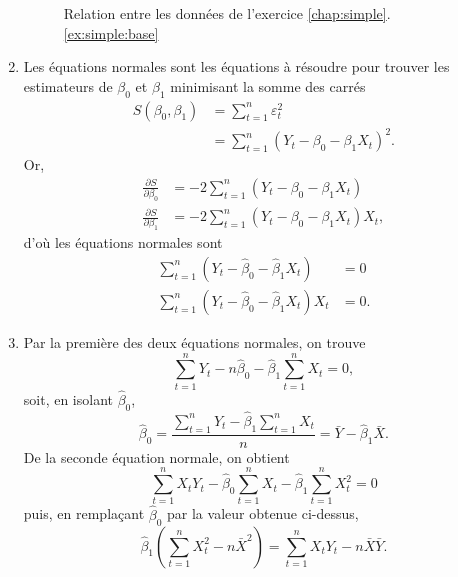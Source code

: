 \begin{solution}{2.1}
\begin{enumerate}
\begin{figure}
\begin{knitrout}
\end{knitrout}
        \caption{Relation entre les données de l'exercice
          \ref{chap:simple}.\ref{ex:simple:base}}
        \label{fig:simple:base}
      \end{figure}
    \item Les équations normales sont les équations à résoudre pour
      trouver les estimateurs de $\beta_0$ et $\beta_1$ minimisant la
      somme des carrés
      \begin{align*}
        S(\beta_0, \beta_1)
        &=\sum_{t = 1}^n \varepsilon^2_t \\
        &=\sum_{t = 1}^n \left(Y_t-\beta_0-\beta_1X_t\right)^2.
      \end{align*}
      Or,
      \begin{align*}
        \frac{\partial S}{\partial \beta_0}
        &= -2 \sum_{t=1}^n (Y_t - \beta_0 - \beta_1 X_t) \\
        \frac{\partial S}{\partial \beta_1}
        &= -2 \sum_{t=1}^n (Y_t - \beta_0 - \beta_1 X_t) X_t,
      \end{align*}
      d'où les équations normales sont
      \begin{align*}
        \sum_{t=1}^n (Y_t - \hat{\beta}_0 - \hat{\beta}_1 X_t) &= 0 \\
        \sum_{t=1}^n (Y_t - \hat{\beta}_0 - \hat{\beta}_1 X_t) X_t &= 0.
      \end{align*}
    \item Par la première des deux équations normales, on trouve
      \begin{displaymath}
        \sum_{t=1}^nY_t-n\hat{\beta}_0-\hat{\beta}_1\sum_{t=1}^nX_t = 0,
      \end{displaymath}
      soit, en isolant $\hat{\beta}_0$,
      \begin{displaymath}
        \hat{\beta}_0=\frac{\sum_{t=1}^nY_t-\hat{\beta}_1\sum_{t=1}^nX_t}{n}=\bar{Y}-\hat{\beta}_1\bar{X}.
      \end{displaymath}
      De la seconde équation normale, on obtient
      \begin{displaymath}
        \sum_{t=1}^n X_t Y_t -
        \hat{\beta}_0 \sum_{t=1}^n X_t -
        \hat{\beta}_1 \sum_{t=1}^n X_t^2 = 0
      \end{displaymath}
      puis, en remplaçant $\hat{\beta}_0$ par la valeur obtenue ci-dessus,
      \begin{displaymath}
        \hat{\beta}_1
        \left(
          \sum_{t=1}^n X_t^2 - n \bar{X}^2
        \right) =
        \sum_{t=1}^n X_t Y_t - n \bar{X} \bar{Y}.

\end{displaymath}
\end{enumerate}
\end{solution}
